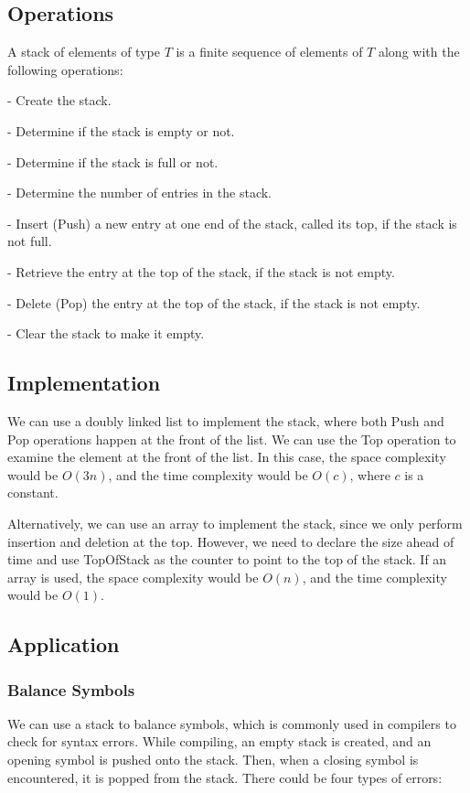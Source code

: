 \subsection{Operations}
A stack of elements of type \(T\) is a finite sequence of elements of \(T\) along with the following operations:

- Create the stack. 

- Determine if the stack is empty or not.

- Determine if the stack is full or not.

- Determine the number of entries in the stack.

- Insert (Push) a new entry at one end of the stack, called its top, if the stack is not full.

- Retrieve the entry at the top of the stack, if the stack is not empty.

- Delete (Pop) the entry at the top of the stack, if the stack is not empty.

- Clear the stack to make it empty.

\subsection{Implementation}
We can use a doubly linked list to implement the stack, where both Push and Pop operations happen at the front of the list. We can use the Top operation to examine the element at the front of the list. In this case, the space complexity would be \(O(3n)\), and the time complexity would be \(O(c)\), where \(c\) is a constant.

Alternatively, we can use an array to implement the stack, since we only perform insertion and deletion at the top. However, we need to declare the size ahead of time and use TopOfStack as the counter to point to the top of the stack. If an array is used, the space complexity would be \(O(n)\), and the time complexity would be \(O(1)\). 

\subsection{Application}
\subsubsection{Balance Symbols}
We can use a stack to balance symbols, which is commonly used in compilers to check for syntax errors. While compiling, an empty stack is created, and an opening symbol is pushed onto the stack. Then, when a closing symbol is encountered, it is popped from the stack. There could be four types of errors:

